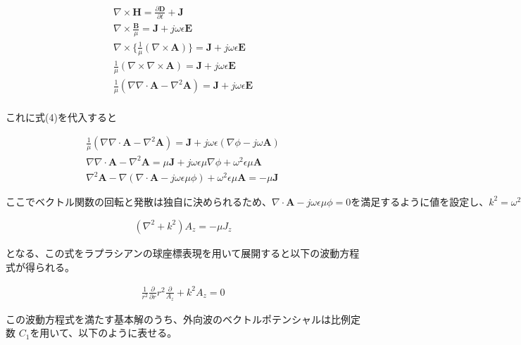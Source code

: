\documentclass[dvipdfmx,autodetect-engine,titlepage]{jsarticle}
\begin{document}
\begin{align*}
  \nabla \times \mathbf{H}  = \frac{\partial \mathbf{D} }{\partial t} + \mathbf{J}\\
  \nabla \times \frac{\mathbf{B}}{\mu } = \mathbf{J} + j\omega\epsilon\mathbf{E}\\
  \nabla \times \{ \frac{1}{\mu} (\nabla \times \mathbf{A}) \} = \mathbf{J} + j\omega\epsilon\mathbf{E}\\
  \frac{1}{\mu}(\nabla\times\nabla\times\mathbf{A}) = \mathbf{J} + j\omega\epsilon\mathbf{E}\\
  \frac{1}{\mu}(\nabla\nabla\cdot\mathbf{A} - \nabla^2 \mathbf{A}) = \mathbf{J} + j\omega\epsilon\mathbf{E}\\
\end{align*}

これに式(4)を代入すると

\begin{align*}
  \frac{1}{\mu}(\nabla\nabla\cdot\mathbf{A} - \nabla^2 \mathbf{A}) = \mathbf{J} + j\omega\epsilon(\nabla \phi - j\omega\mathbf{A})\\
  \nabla\nabla\cdot\mathbf{A} - \nabla^2 \mathbf{A} = \mu\mathbf{J} + j\omega\epsilon\mu\nabla\phi + \omega^2 \epsilon\mu\mathbf{A}\\
  \nabla^2 \mathbf{A} - \nabla(\nabla\cdot\mathbf{A} - j\omega\epsilon\mu\phi) + \omega^2 \epsilon\mu\mathbf{A} = -\mu\mathbf{J}
\end{align*}

\begin{math}
  ここでベクトル関数の回転と発散は独自に決められるため、
  \nabla\cdot\mathbf{A} - j\omega\epsilon\mu\phi=0 を満足するように
  値を設定し、k^2 = \omega^2 \epsilon\mu とすると
\end{math}

\begin{align}
  (\nabla^2 + k^2)A_z = -\mu J_z
\end{align}

となる、この式をラプラシアンの球座標表現を用いて展開すると以下の波動方程式が得られる。

\begin{align*}
  \frac{1}{r^2}\frac{\partial}{\partial r}r^2\frac{\partial}{A_z} + k^2 A_z = 0
\end{align*}

この波動方程式を満たす基本解のうち、外向波のベクトルポテンシャルは比例定数
\begin{math}C_1\end{math}を用いて、以下のように表せる。
\end{document}

